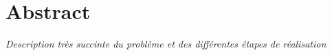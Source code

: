 \chapter*{Abstract}
\emph{Description très succinte du problème et des différentes étapes de réalisation}

\clearpage